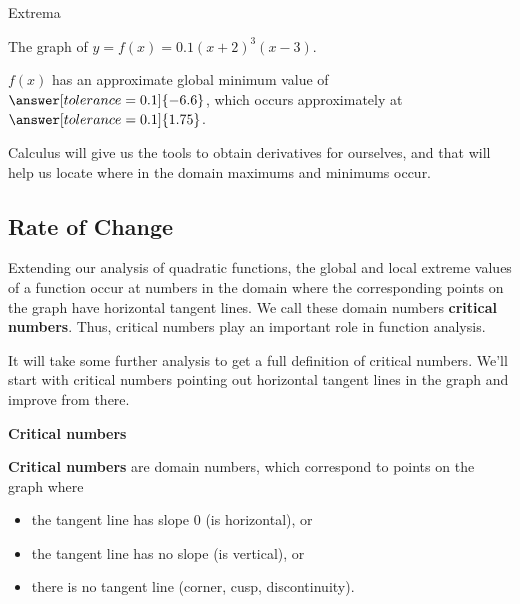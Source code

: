 \documentclass{ximera}
\begin{document}
\begin{example} Extrema

The graph of $y = f(x) = 0.1(x+2)^3(x-3)$.



\begin{center}
\end{center}



$f(x)$ has an approximate global minimum value of $\answer[tolerance=0.1]{-6.6}$, which occurs approximately at $\answer[tolerance=0.1]{1.75}$.


\end{example}


Calculus will give us the tools to obtain derivatives for ourselves, and that will help us locate where in the domain maximums and minimums occur.



\subsection*{Rate of Change}


Extending our analysis of quadratic functions, the global and local extreme values of a function occur at numbers in the domain where the corresponding points on the graph have horizontal tangent lines. We call these domain numbers \textbf{critical numbers}.  Thus, critical numbers play an important role in function analysis.  


It will take some further analysis to get a full definition of critical numbers. We'll start with critical numbers pointing out horizontal tangent lines in the graph and improve from there.









\begin{idea} \item \textbf{\textcolor{blue!55!black}{Critical numbers}}

\textbf{Critical numbers} are domain numbers, which correspond to points on the graph where 

\begin{itemize}
\item the tangent line has slope $0$ (is horizontal), or 
\item the tangent line has no slope (is vertical), or
\item there is no tangent line (corner, cusp, discontinuity).
\end{itemize}


\end{idea}
\end{document}
